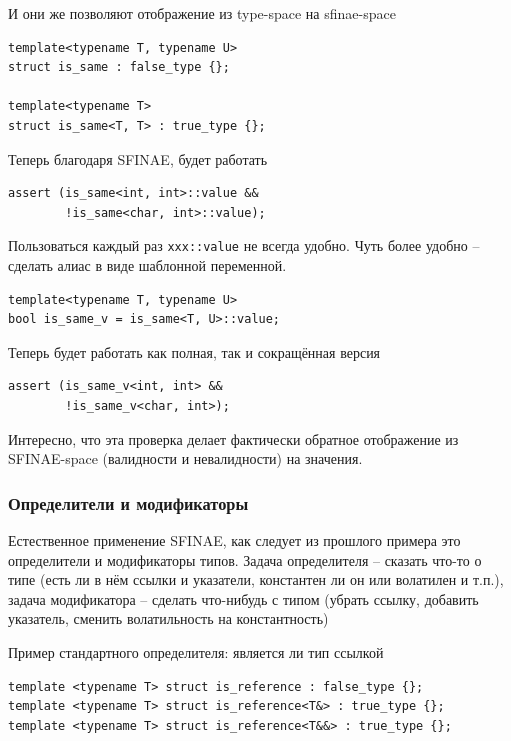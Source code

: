 \documentclass[a4paper,12pt,oneside]{article}
\begin{document}
И они же позволяют отображение из type-space на sfinae-space

\begin{lstlisting}
template<typename T, typename U> 
struct is_same : false_type {};

template<typename T> 
struct is_same<T, T> : true_type {};
\end{lstlisting}

Теперь благодаря SFINAE, будет работать

\begin{lstlisting}
assert (is_same<int, int>::value && 
        !is_same<char, int>::value);
\end{lstlisting}
 
Пользоваться каждый раз \lstinline!xxx::value! не всегда удобно. Чуть более удобно -- сделать алиас в виде шаблонной переменной.

\begin{lstlisting}
template<typename T, typename U> 
bool is_same_v = is_same<T, U>::value;
\end{lstlisting}

Теперь будет работать как полная, так и сокращённая версия

\begin{lstlisting}
assert (is_same_v<int, int> && 
        !is_same_v<char, int>);
\end{lstlisting}

Интересно, что эта проверка делает фактически обратное отображение из SFINAE-space (валидности и невалидности) на значения.

\subsubsection{Определители и модификаторы}\label{TypeTraits}

Естественное применение SFINAE, как следует из прошлого примера это определители и модификаторы типов. Задача определителя -- сказать что-то о типе (есть ли в нём ссылки и указатели, константен ли он или волатилен и т.п.), задача модификатора -- сделать что-нибудь с типом (убрать ссылку, добавить указатель, сменить волатильность на константность)

Пример стандартного определителя: является ли тип ссылкой

\begin{lstlisting}
template <typename T> struct is_reference : false_type {};
template <typename T> struct is_reference<T&> : true_type {};
template <typename T> struct is_reference<T&&> : true_type {};
\end{lstlisting}
\end{document}
